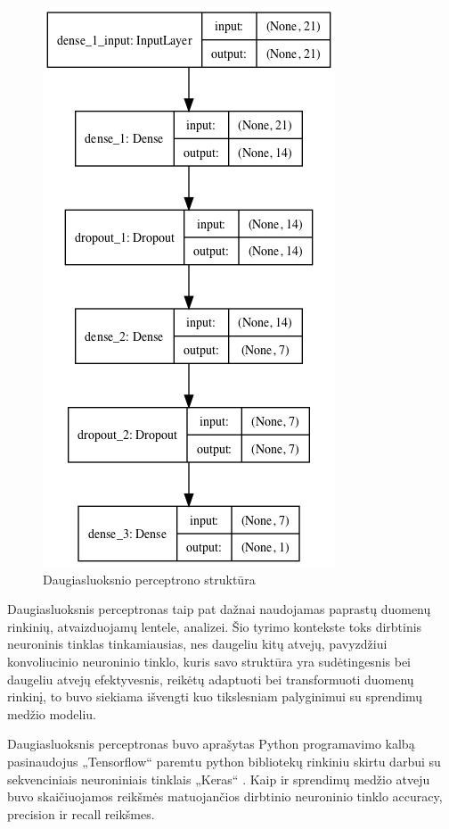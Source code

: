 \documentclass{VUMIFPSbakalaurinis}
\begin{document}
\begin{figure}[H]
    \centering
    \includegraphics[scale=0.5]{img/model}
    \caption{Daugiasluoksnio perceptrono struktūra}
    \label{img:model}
\end{figure}

Daugiasluoksnis perceptronas taip pat dažnai naudojamas paprastų duomenų rinkinių, atvaizduojamų lentele, analizei. Šio tyrimo kontekste toks dirbtinis neuroninis tinklas tinkamiausias, nes daugeliu kitų atvejų, pavyzdžiui konvoliucinio neuroninio tinklo, kuris savo struktūra yra sudėtingesnis bei daugeliu atvejų efektyvesnis, reikėtų adaptuoti bei transformuoti duomenų rinkinį, to buvo siekiama išvengti kuo tikslesniam palyginimui su sprendimų medžio modeliu.

Daugiasluoksnis perceptronas buvo aprašytas Python programavimo kalbą pasinaudojus „Tensorflow“ paremtu python bibliotekų rinkiniu skirtu darbui su sekvenciniais neuroniniais tinklais „Keras“ \cite{chollet2015keras}. Kaip ir sprendimų medžio atveju buvo skaičiuojamos reikšmės matuojančios dirbtinio neuroninio tinklo accuracy, precision ir recall reikšmes.
\end{document}
